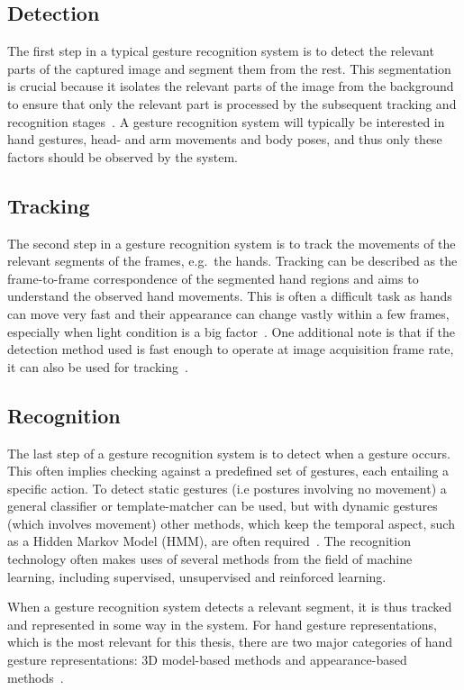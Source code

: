 \subsection{Detection}
The first step in a typical gesture recognition system is to detect the relevant parts of the captured image and segment them from the rest. 
This segmentation is crucial because it isolates the relevant parts of the image from the background to ensure that only the relevant part is processed by the subsequent 
tracking and recognition stages~\citep{Cote2006}. 
A gesture recognition system will typically be interested in hand gestures, head- and arm movements and body poses, and thus only these factors should be observed by the system.

\subsection{Tracking}
The second step in a gesture recognition system is to track the movements of the relevant segments of the frames, e.g.~the hands. 
Tracking can be described as the frame-to-frame correspondence of the segmented hand regions and aims to understand the observed hand movements. 
This is often a difficult task as hands can move very fast and their appearance can change vastly within a few frames, 
especially when light condition is a big factor~\citep{Wang2010}. 
One additional note is that if the detection method used is fast enough to operate at image acquisition frame rate, it can also be used for tracking~\citep{Rautaray2015}.   

\subsection{Recognition}
The last step of a gesture recognition system is to detect when a gesture occurs. 
This often implies checking against a predefined set of gestures, each entailing a specific action. 
To detect static gestures (i.e postures involving no movement) a general classifier or template-matcher can be used, 
but with dynamic gestures (which involves movement) other methods, which keep the temporal aspect, such as a Hidden Markov Model (HMM), are often required~\citep{Benton1995}. 
The recognition technology often makes uses of several methods from the field of machine learning, including supervised, unsupervised and reinforced learning.

When a gesture recognition system detects a relevant segment, it is thus tracked and represented in some way in the system. For hand gesture representations, 
which is the most relevant for this thesis, there are two major categories of hand gesture representations: 3D model-based methods and appearance-based methods~\citep{Rautaray2015}.

